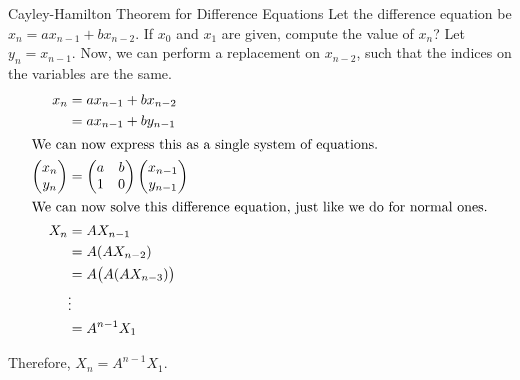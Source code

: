 \begin{example}{Cayley-Hamilton Theorem for Difference Equations}
  Let the difference equation be $x_{n} = ax_{n-1}+ bx_{n-2}$.
  If $x_{0}$ and $x_{1}$ are given, compute the value of $x_{n}$?
  \tcblower{}
  Let $y_{n} = x_{n-1}$.
  Now, we can perform a replacement on $x_{n-2}$, such that the indices on the variables are the same.
  \begin{align*}
    x_{n} &= ax_{n-1}+ bx_{n-2} \\
          &= ax_{n-1} + by_{n-1} \\
    \intertext{We can now express this as a single system of equations.}
    \begin{pmatrix}
      x_{n} \\
      y_{n}
    \end{pmatrix} &=
                    \begin{pmatrix}
                      a & b \\
                      1 & 0
                    \end{pmatrix}
                          \begin{pmatrix}
                            x_{n-1} \\
                            y_{n-1}
                          \end{pmatrix} \\
    \intertext{We can now solve this difference equation, just like we do for normal ones.}
    X_{n} &= A X_{n-1} \\
          &= A(A X_{n-2}) \\
          &= A \bigl( A (A X_{n-3}) \bigr) \\
          &\vdots \\
          &= A^{n-1} X_{1}
  \end{align*}

  Therefore, $X_{n} = A^{n-1} X_{1}$.
\end{example}

